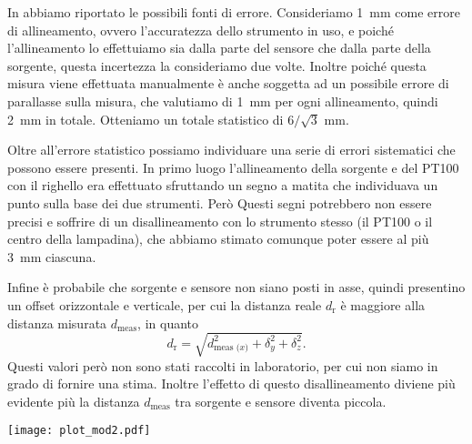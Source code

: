 \documentclass[
    rmp,
    reprint, 
    superscriptaddress, 
    altaffilletter, 
    amsmath, 
    amssymb,
    a4paper]{revtex4-2}
\begin{document}
In  abbiamo riportato le possibili fonti di errore. Consideriamo \SI{1}{\milli\metre} come errore di allineamento, ovvero l'accuratezza dello strumento in uso, e poiché l'allineamento lo effettuiamo sia dalla parte del sensore che dalla parte della sorgente, questa incertezza la consideriamo due volte. Inoltre poiché questa misura viene effettuata manualmente è anche soggetta ad un possibile errore di parallasse sulla misura, che valutiamo di \SI{1}{\milli\metre} per ogni allineamento, quindi \SI{2}{\milli\metre} in totale. Otteniamo un totale statistico di $6/\sqrt{3}$ mm.

Oltre all'errore statistico possiamo individuare una serie di errori sistematici che possono essere presenti. In primo luogo l'allineamento della sorgente e del PT100 con il righello era effettuato sfruttando un segno a matita che individuava un punto sulla base dei due strumenti. Però Questi segni potrebbero non essere precisi e soffrire di un disallineamento con lo strumento stesso (il PT100 o il centro della lampadina), che abbiamo stimato comunque poter essere al più \SI{3}{\milli\metre} ciascuna. 

Infine è probabile che sorgente e sensore non siano posti in asse, quindi presentino un offset orizzontale e verticale, per cui la distanza reale $d_{\text{r}}$ è maggiore alla distanza misurata $d_{\text{meas}}$, in quanto 
\[
    d_{\text{r}} = \sqrt{d_{\text{meas ($x$)}}^2 + \delta_y^2 + \delta_z^2}.
\]
Questi valori però non sono stati raccolti in laboratorio, per cui non siamo in grado di fornire una stima. Inoltre l'effetto di questo disallineamento diviene più evidente più la distanza $d_{\text{meas}}$ tra sorgente e sensore diventa piccola.


\begin{figure*}
    \texttt{[image: plot\_mod2.pdf]}
    \caption{\textbf{Applicazione del secondo modello di analisi dei dati}. A sinistra abbiamo i diversi dati raccolti su cui eseguiamo un fit lineare entro un intorno del punto che vogliamo misurare, per poter effettuare una misura ad una data distanza temporale, poiché i dati non si presentano continui. Si può inoltre osservare come di fatto dopo circa \SI[parse-numbers=false]{30/40}{\second} il comportamento della tensione diventi lineare, in accordo con quanto ipotizzato possa essere il suo comportamento pratico. A destra invece troviamo più chiaro il comportamento $d^{a}$ come  previsto, anche se qualitativamente non è facile individuare il range in cui $a$ può trovarsi. L'errore è quello valutato a seguito di una analisi sulle incertezze sistematiche, la banda orizzontale segna questa incertezza complessiva, i marker verticali indicano dove era stimato l'errore precedente a queste considerazioni. Questo cambiamento è ben visibile sopratutto nel primo punto.}
    \label{fig:plot:mod2}
\end{figure*}
\end{document}
